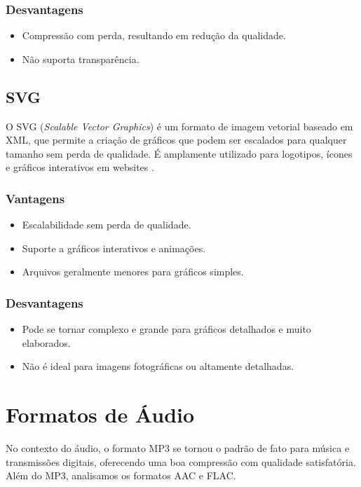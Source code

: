 \documentclass[12pt]{report}
\begin{document}
	\subsubsection{Desvantagens}
	\begin{itemize}
		\item Compressão com perda, resultando em redução da qualidade.
		\item Não suporta transparência.
	\end{itemize}
	
	\subsection{SVG}
	O SVG (\textit{Scalable Vector Graphics}) é um formato de imagem vetorial baseado em XML, que permite a criação de gráficos que podem ser escalados para qualquer tamanho sem perda de qualidade. É amplamente utilizado para logotipos, ícones e gráficos interativos em websites \cite{w3c2023}.
	
	\subsubsection{Vantagens}
	\begin{itemize}
		\item Escalabilidade sem perda de qualidade.
		\item Suporte a gráficos interativos e animações.
		\item Arquivos geralmente menores para gráficos simples.
	\end{itemize}
	
	\subsubsection{Desvantagens}
	\begin{itemize}
		\item Pode se tornar complexo e grande para gráficos detalhados e muito elaborados.
		\item Não é ideal para imagens fotográficas ou altamente detalhadas.
	\end{itemize}
	
	\section{Formatos de Áudio}
	No contexto do áudio, o formato MP3 se tornou o padrão de fato para música e transmissões digitais, oferecendo uma boa compressão com qualidade satisfatória. Além do MP3, analisamos os formatos AAC e FLAC.
	
\end{document}
